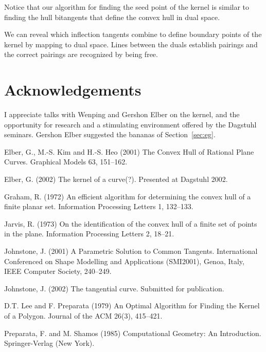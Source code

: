\documentclass[12pt]{article}
\begin{document}
Notice that our algorithm for finding the seed point of the kernel
is similar to finding the hull bitangents that define the
convex hull in dual space.

We can reveal which inflection tangents combine to define boundary points
of the kernel by mapping to dual space.
Lines between the duals establish
pairings and the correct pairings are recognized by being free.

\section{Acknowledgements}

I appreciate talks with Wenping and Gershon Elber on the kernel,
and the opportunity for research and a stimulating
environment offered by the Dagstuhl seminars.
Gershon Elber suggested the bananas of Section~\ref{sec:eg}.



\begin{thebibliography}{Preparata 85}

Elber, G., M.-S. Kim and H.-S. Heo (2001)
The Convex Hull of Rational Plane Curves.
Graphical Models 63, 151--162.

Elber, G. (2002)
The kernel of a curve(?).
Presented at Dagstuhl 2002.

Graham, R. (1972)
An efficient algorithm for determining the convex hull of a finite planar set.
Information Processing Letters 1, 132--133.

Jarvis, R. (1973)
On the identification of the convex hull of a finite set of points
in the plane.
Information Processing Letters 2, 18--21.

Johnstone, J. (2001)
A Parametric Solution to Common Tangents.
International Conferenced on Shape Modelling and Applications (SMI2001),
Genoa, Italy, IEEE Computer Society, 240--249.

Johnstone, J. (2002)
The tangential curve.
Submitted for publication.

D.T. Lee and F. Preparata (1979)
An Optimal Algorithm for Finding the Kernel of a Polygon.
Journal of the ACM 26(3), 415--421.

Preparata, F. and M. Shamos (1985)
Computational Geometry: An Introduction.
Springer-Verlag (New York).


\end{thebibliography}
\end{document}
